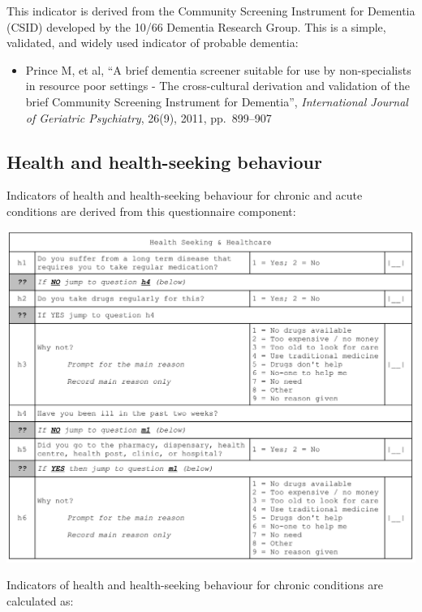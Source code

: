 \documentclass[12pt,a4paper]{book}
\providecommand{\tightlist}{%
  \setlength{\itemsep}{0pt}\setlength{\parskip}{0pt}}
\theoremstyle{definition}
\theoremstyle{definition}
\theoremstyle{definition}
\theoremstyle{remark}
\begin{document}
This indicator is derived from the Community Screening Instrument for
Dementia (CSID) developed by the 10/66 Dementia Research Group. This is
a simple, validated, and widely used indicator of probable dementia:

\begin{itemize}
\tightlist
\item
  Prince M, et al, ``A brief dementia screener suitable for use by
  non-specialists in resource poor settings - The cross-cultural
  derivation and validation of the brief Community Screening Instrument
  for Dementia'', \emph{International Journal of Geriatric Psychiatry},
  26(9), 2011, pp.~899--907
\end{itemize}

\newpage

\hypertarget{health-and-health-seeking-behaviour}{%
\subsection{Health and health-seeking
behaviour}\label{health-and-health-seeking-behaviour}}

Indicators of health and health-seeking behaviour for chronic and acute
conditions are derived from this questionnaire component:

\begin{center}\includegraphics{figures/questionnaire08} \end{center}

\newpage

Indicators of health and health-seeking behaviour for chronic conditions
are calculated as:
\end{document}
